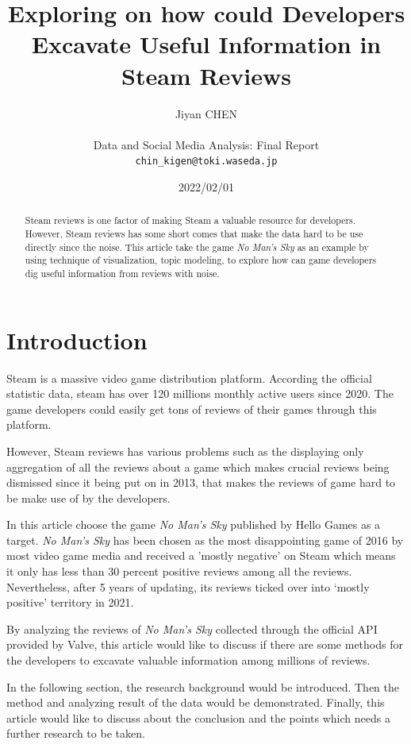\documentclass[12pt]{article}
\title{Exploring on how could Developers Excavate Useful Information in Steam Reviews}
\author{Jiyan CHEN \\ \\
Data and Social Media Analysis: Final Report \\ {\tt chin\_kigen@toki.waseda.jp}}
\date{2022/02/01}
\begin{document}
\maketitle
\begin{abstract}
Steam reviews is one factor of making Steam a valuable resource for developers. However, Steam reviews has some short comes that make the data hard to be use directly since the noise. This article take the game \textsl{No Man's Sky} as an example by using technique of visualization, topic modeling, to explore how can game developers dig useful information from reviews with noise.
\end{abstract}


\section{Introduction}
\label{intro}

Steam is a massive video game distribution platform. According the official statistic data, steam has over 120 millions monthly active users since 2020. The game developers could easily get tons of reviews of their games through this platform. 

However, Steam reviews has various problems such as the displaying only aggregation of all the reviews about a game which makes crucial reviews being dismissed since it being put on in 2013, that makes the reviews of game hard to be make use of by the developers.

In this article choose the game \textsl{No Man's Sky} published by Hello Games as a target. \textsl{No Man's Sky} has been chosen as the most disappointing game of 2016 by most video game media and received a 'mostly negative' on Steam which means it only has less than 30 percent positive reviews among all the reviews. Nevertheless, after 5 years of updating, its reviews ticked over into ‘mostly positive’ territory in 2021.

By analyzing the reviews of \textsl{No Man's Sky} collected through the official API provided by Valve, this article would like to discuss if there are some methods for the developers to excavate valuable information among millions of reviews. 

In the following section, the research background would be introduced. Then the method and analyzing result of the data would be demonstrated. Finally, this article would like to discuss about the conclusion and the points which needs a further research to be taken.
\end{document}
